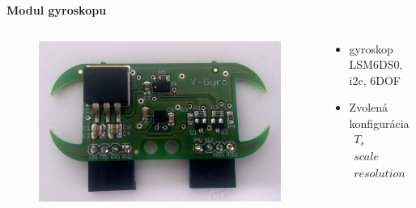 \documentclass[xcolor=dvipsnames]{beamer}
\begin{document}
\begin{frame}{\bf Modul gyroskopu}


\begin{columns}

  \begin{column}{0.5\textwidth}

      \begin{figure}[ht]
      \begin{center}
      \begin{minipage}{0.8\linewidth}
      \begin{center}
      \includegraphics[width=1.1\textwidth]{gyro_module.jpg}
      \end{center}
      \end{minipage}
      \end{center}
      \end{figure}

  \end{column}


  \begin{column}{0.5\textwidth}

  \begin{itemize}
    \item gyroskop LSM6DS0, i2c, 6DOF
    \item Zvolená konfigurácia
          \begin{align*}
            T_s &= 10ms \quad (1ms) \\
            scale &= 500^{\circ}/s \quad (2000^{\circ}/s) \\
            resolution &= 17.50 m^{\circ} / bit \quad (8.75 m^{\circ} / bit)
          \end{align*}

  \end{itemize}

  \end{column}
\end{columns}


\end{frame}
\end{document}

